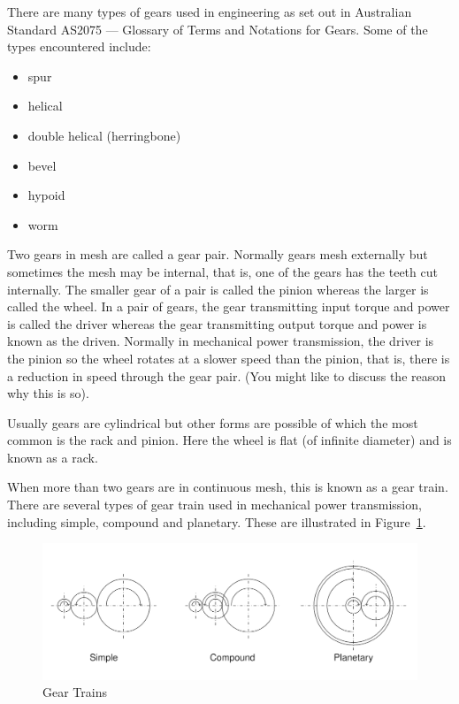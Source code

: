 There are many types of gears used in engineering as set out in Australian Standard AS2075 --- Glossary of Terms and Notations for Gears. Some of the types encountered include:

\begin{itemize}
  \item spur
  \item helical
  \item double helical (herringbone)
  \item bevel
  \item hypoid
  \item worm
\end{itemize}

Two gears in mesh are called a gear pair. Normally gears mesh externally but sometimes the mesh may be internal, that is, one of the gears has the teeth cut internally. The smaller gear of a pair is called the pinion whereas the larger is called the wheel. In a pair of gears, the gear transmitting input torque and power is called the driver whereas the gear transmitting output torque and power is known as the driven. Normally in mechanical power transmission, the driver is the pinion so the wheel rotates at a slower speed than the pinion, that is, there is a reduction in speed through the gear pair. (You might like to discuss the reason why this is so).

Usually gears are cylindrical but other forms are possible of which the most common is the rack and pinion. Here the wheel is flat (of infinite diameter) and is known as a rack.

When more than two gears are in continuous mesh, this is known as a gear train. There are several types of gear train used in mechanical power transmission, including simple, compound and planetary. These are illustrated in Figure~\ref{fig-1}.

\begin{figure}[h!]
  \center
  \includegraphics[width=\textwidth]{figs/gear-trains.png}
  \caption{Gear Trains}
  \label{fig-1}
\end{figure}

